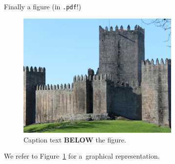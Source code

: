\documentclass[twoside]{report}
\begin{document}

%
%

Finally a figure (in \verb|.pdf|!)

\begin{figure}[!ht]\centering
\includegraphics[width=8cm]{castelo.pdf}
\caption{\label{smith:fig1} Caption text \textbf{BELOW} the figure.}
\end{figure}


We refer to Figure~\ref{smith:fig1} for a~graphical representation.





\end{document}
